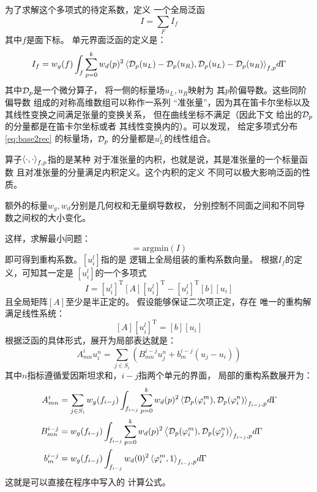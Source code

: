 \documentclass[UTF8,zihao=5]{ctexart} %
\newcommand{\trans}[0]{^\mathrm{T}}
\newcommand*{\mean}[1]{{#1}}
\begin{document}
为了求解这个多项式的待定系数，定义
一个全局泛函
\begin{equation}
    I=\sum_{F}{I_f}
\end{equation}
其中$f$是面下标。
单元界面泛函的定义是：
\begin{equation}\label{eq:IJI}
    I_f = w_g(f) \int_f{\sum_{p=0}^k{
    w_d(p)^2 \left\langle\mathcal{D}_p(u_L)-\mathcal{D}_p(u_R),\mathcal{D}_p(u_L)-\mathcal{D}_p(u_R)\right\rangle_{f,p}
    } d\Gamma}
\end{equation}
其中$\mathcal{D}_p$是一个微分算子，
将一侧的标量场$u_L, u_R$映射为
其$p$阶偏导数。这些同阶偏导数
组成的对称高维数组可以称作一系列
“准张量”，因为其在笛卡尔坐标以及
其线性变换之间满足张量的变换关系，
但在曲线坐标不满足（因此下文
给出的$\mathcal{D}_p$的分量都是在笛卡尔坐标或者
其线性变换内的）。可以发现，
给定多项式分布\eqref{eq:base2rec}
的标量场，$\mathcal{D}_p$
的分量都是$u^l_L$的线性组合。

算子$\left\langle\cdot,\cdot\right\rangle_{f,p}$指的是某种
对于准张量的内积，也就是说，其是准张量的一个标量函数
且对准张量的分量满足内积定义。这个内积的定义
不同可以极大影响泛函的性质。

额外的标量$w_g,w_d$分别是几何权和无量纲导数权，
分别控制不同面之间和不同导数之间权的大小变化。

这样，求解最小问题：
\begin{equation}
    [u_i^l] = \text{argmin}(I)
\end{equation}
即可得到重构系数。$[u_i^l]$指的是
逻辑上全局组装的重构系数向量。
根据$I_f$的定义，可知其一定是
$[u_i^l]$的一个多项式
\begin{equation}
    I = [u_i^l]\trans [A] [u_i^l]\trans
    - [u_i^l]\trans [b][\mean{u}_i]
\end{equation}
且全局矩阵$[A]$至少是半正定的。
假设能够保证二次项正定，存在
唯一的重构解满足线性系统：
\begin{equation} \label{eq:VREQ}
    [A] [u_i^l]\trans
    =[b][\mean{u}_i]
\end{equation}
根据泛函的具体形式，展开为局部表达就是：
\begin{equation} \label{eq:VREQ_local}
    A_{mn}^i u_i^n = \sum_{j\in S_i}{
        \left(B_{mn}^{i-j} u_j^n
        +
        b_{m}^{i-j}(\mean{u}_j - \mean{u}_i)
        \right)}
\end{equation}
其中$n$指标遵循爱因斯坦求和，$i-j$指两个单元的界面，
局部的重构系数展开为：
\begin{equation}
    \begin{aligned} \label{eq:VRCoefs}
        A_{mn}^i     & = \sum_{j\in S_i} {
        w_g(f_{i-j}) \int_{f_{i-j}}{\sum_{p=0}^k{
        w_d(p)^2 \left\langle\mathcal{D}_p(\varphi^m_i),\mathcal{D}_p(\varphi^n_i)\right\rangle_{f_{i-j},p}
        } d\Gamma}}                        \\
        B_{mn}^{i-j} & = {
        w_g(f_{i-j}) \int_{f_{i-j}}{\sum_{p=0}^k{
        w_d(p)^2 \left\langle\mathcal{D}_p(\varphi^m_i),\mathcal{D}_p(\varphi^n_j)\right\rangle_{f_{i-j},p}
        } d\Gamma}}                        \\
        b_{m}^{i-j}  & = {
        w_g(f_{i-j}) \int_{f_{i-j}}{{
        w_d(0)^2 \left\langle\varphi^m_i,1\right\rangle_{f_{i-j},p}
        } d\Gamma}}
    \end{aligned}
\end{equation}
这就是可以直接在程序中写入的
计算公式。
\end{document}
